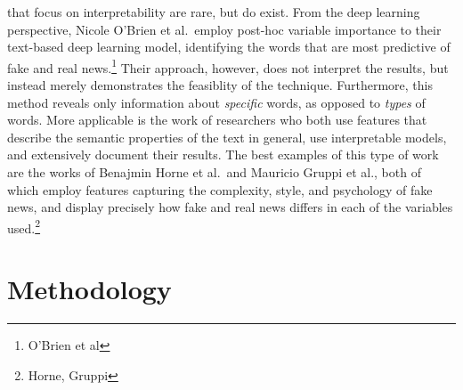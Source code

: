 \documentclass[12pt]{article}
\begin{document}
that focus on interpretability are rare, but do exist. From the deep
learning perspective, Nicole O'Brien et al.~employ post-hoc variable
importance to their text-based deep learning model, identifying the
words that are most predictive of fake and real news.\footnote{O'Brien
  et al} Their approach, however, does not interpret the results, but
instead merely demonstrates the feasiblity of the technique.
Furthermore, this method reveals only information about \emph{specific}
words, as opposed to \emph{types} of words. More applicable is the work
of researchers who both use features that describe the semantic
properties of the text in general, use interpretable models, and
extensively document their results. The best examples of this type of
work are the works of Benajmin Horne et al.~and Mauricio Gruppi et al.,
both of which employ features capturing the complexity, style, and
psychology of fake news, and display precisely how fake and real news
differs in each of the variables used.\footnote{Horne, Gruppi}

\section{Methodology}
\end{document}
